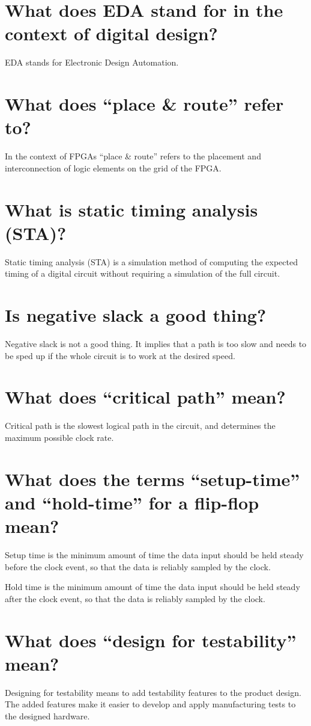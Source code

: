 \documentclass{article}
\begin{document}
\section{What does EDA stand for in the context of digital design?}
EDA stands for Electronic Design Automation.

\section{What does “place \& route” refer to?}
In the context of FPGAs ``place \& route'' refers to the placement and
interconnection of logic elements on the grid of the FPGA.

\section{What is static timing analysis (STA)?}
Static timing analysis (STA) is a simulation method of computing the
expected timing of a digital circuit without requiring a simulation of
the full circuit.

\section{Is negative slack a good thing?}
Negative slack is not a good thing. It implies that a path is too slow
and needs to be sped up if the whole circuit is to work at the desired
speed.

\section{What does ``critical path'' mean?}
Critical path is the slowest logical path in the circuit, and
determines the maximum possible clock rate.

\section{What does the terms ``setup-time'' and ``hold-time'' for a
  flip-flop mean?}
Setup time is the minimum amount of time the data input should be held
steady before the clock event, so that the data is reliably sampled by
the clock.

Hold time is the minimum amount of time the data input should be held
steady after the clock event, so that the data is reliably sampled by
the clock.

\section{What does ``design for testability'' mean?}
Designing for testability means to add testability features to the
product design. The added features make it easier to develop and apply
manufacturing tests to the designed hardware.
\end{document}
